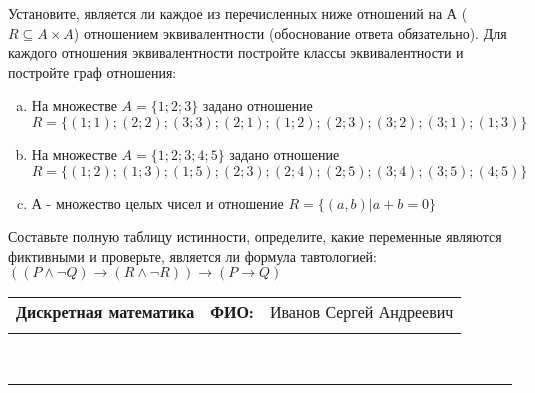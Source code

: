 \documentclass[10pt]{exam}
\newcommand{\class}{Дискретная математика}
\newcommand{\examdate}{}
\begin{document}
\begin{questions}
\question
Установите, является ли каждое из перечисленных ниже отношений на А ($R \subseteq A \times A$) отношением эквивалентности (обоснование ответа обязательно). Для каждого отношения эквивалентности постройте классы 
эквивалентности и постройте граф отношения:
\begin{enumerate} [a)]\setcounter{enumi}{0}
\item На множестве $A = \{1; 2; 3\}$ задано отношение $R = \{(1; 1); (2; 2); (3; 3); (2; 1); (1; 2); (2; 3); (3; 2); (3; 1); (1; 3)\}$
\item На множестве $A = \{1; 2; 3; 4; 5\}$ задано отношение $R = \{(1; 2); (1; 3); (1; 5); (2; 3); (2; 4); (2; 5); (3; 4); (3; 5); (4; 5)\}$
\item А - множество целых чисел и отношение $R = \{(a,b)|a + b = 0\}$
\end{enumerate}\question Составьте полную таблицу истинности, определите, какие переменные являются фиктивными и проверьте, является ли формула тавтологией:
$(( P \land \neg Q) \rightarrow (R \land \neg R)) \rightarrow (P \rightarrow Q)$

\end{questions}
\newpage
\begin{flushright}
\begin{tabular}{p{2.8in} r l}
\textbf{\class} & \textbf{ФИО:} &Иванов Сергей Андреевич
\\

\textbf{\examdate} &&\\
\end{tabular}\\
\end{flushright}
\rule[1ex]{\textwidth}{.1pt}
\end{document}
